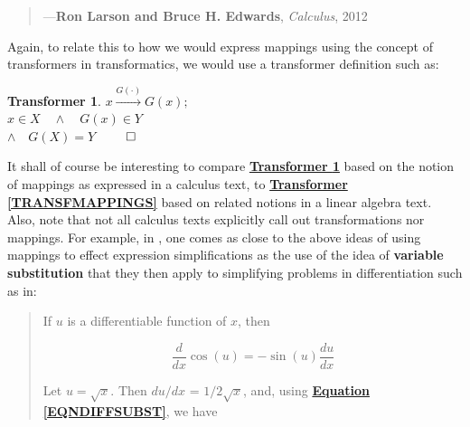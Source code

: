 \documentclass[a4paper, 18pt]{book} %
\newtheorem{transf}{Transformer}
\begin{document}
\begin{appendices}
\begin{minipage}{1\textwidth}
\begin{quotation}
{}
\hspace*{\fill} ---\textbf{Ron Larson and Bruce H. Edwards}, \textit{Calculus}, 2012\cite{ronlarsoncalculus}
\end{quotation}
\vspace{1em}
\end{minipage}

\vspace{2em}


Again, to relate this to how we would express mappings using the concept of transformers in transformatics, we would use a transformer definition such as:


\vspace{1em}

\begin{transf}
\label{TRANSFMAPPINGSCALC}
$ x \xrightarrow{G(\cdot)} G(x);$\\
$ x \in X \quad \land \quad G(x) \in Y$\\
$\land \quad G(X) = Y$
$\qed$
\end{transf}

\vspace{1em}


It shall of course be interesting to compare \textbf{\hyperref[TRANSFMAPPINGSCALC]{Transformer \ref{TRANSFMAPPINGSCALC}}} based on the notion of mappings as expressed in a calculus text, to \textbf{\hyperref[TRANSFMAPPINGS]{Transformer \ref{TRANSFMAPPINGS}}} based on related notions in a linear algebra text. Also, note that not all calculus texts explicitly call out transformations nor mappings. For example, in \cite{Grossman1986CalculusOneVariable}, one comes as close to the above ideas of using mappings to effect expression simplifications as the use of the idea of \textbf{variable substitution} that they then apply to simplifying problems in differentiation such as in:


\noindent
\begin{minipage}{1\textwidth}
\vspace{1em}
\begin{quotation}
{\ttfamily

If $u$ is a differentiable function of $x$, then 

\begin{equation}
\label{EQNDIFFSUBST}
\frac{d}{dx} \cos(u) = - \sin(u) \frac{du}{dx}
\end{equation}


Let $u = \sqrt{x}$. Then $du/dx$ = $1/2\sqrt{x}$, and, using \textbf{\hyperref[EQNDIFFSUBST]{Equation \ref{EQNDIFFSUBST}}}, we have\\

}
\end{quotation}
\end{minipage}
\end{appendices}
\end{document}
